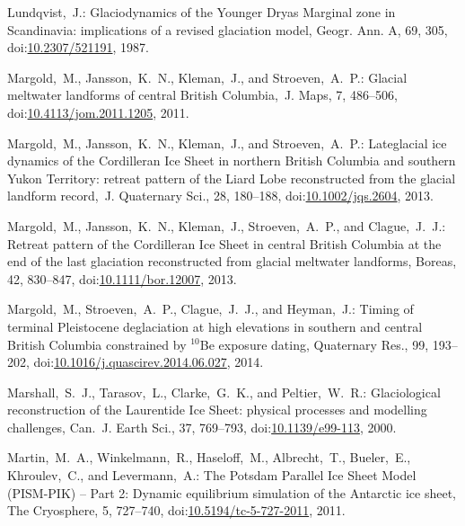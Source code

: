 \documentclass[tc, manuscript]{copernicus}
\begin{document}
\begin{thebibliography}{114}
Lundqvist,~J.: Glaciodynamics of the Younger Dryas Marginal zone in Scandinavia: implications of a revised glaciation model, Geogr. Ann. A, 69, 305,
doi:\href{http://dx.doi.org/10.2307/521191}{10.2307/521191}, 1987.


Margold,~M., Jansson,~K.~N., Kleman,~J., and Stroeven,~A.~P.: Glacial meltwater landforms of central British Columbia,~J. Maps, 7, 486--506,
doi:\href{http://dx.doi.org/10.4113/jom.2011.1205}{10.4113/jom.2011.1205}, 2011.


Margold,~M., Jansson,~K.~N., Kleman,~J., and Stroeven,~A.~P.: Lateglacial ice dynamics of the Cordilleran Ice Sheet in northern British Columbia and southern Yukon Territory: retreat pattern of the Liard Lobe reconstructed from the glacial landform record,~J. Quaternary Sci., 28, 180--188,
doi:\href{http://dx.doi.org/10.1002/jqs.2604}{10.1002/jqs.2604}, 2013{}.


Margold,~M., Jansson,~K.~N., Kleman,~J., Stroeven,~A.~P., and Clague,~J.~J.: Retreat pattern of the Cordilleran Ice Sheet in central British Columbia at the end of the last glaciation reconstructed from glacial meltwater landforms, Boreas, 42, 830--847,
doi:\href{http://dx.doi.org/10.1111/bor.12007}{10.1111/bor.12007}, 2013{}.


Margold,~M., Stroeven,~A.~P., Clague,~J.~J., and Heyman,~J.: Timing of terminal Pleistocene deglaciation at high elevations in southern and central British Columbia constrained by $^{10}$Be exposure dating, Quaternary Res., 99, 193--202,
doi:\href{http://dx.doi.org/10.1016/j.quascirev.2014.06.027}{10.1016/j.quascirev.2014.06.027}, 2014.


Marshall,~S.~J., Tarasov,~L., Clarke,~G.~K., and Peltier,~W.~R.: Glaciological reconstruction of the Laurentide Ice Sheet: physical processes and modelling challenges, Can.~J. Earth Sci., 37, 769--793,
doi:\href{http://dx.doi.org/10.1139/e99-113}{10.1139/e99-113}, 2000.


 Martin,~M.~A., Winkelmann,~R., Haseloff,~M., Albrecht,~T., Bueler,~E., Khroulev,~C., and Levermann,~A.: The Potsdam Parallel Ice Sheet Model (PISM-PIK) -- Part 2: Dynamic equilibrium simulation of the Antarctic ice sheet, The Cryosphere, 5, 727--740,
doi:\href{http://dx.doi.org/10.5194/tc-5-727-2011}{10.5194/tc-5-727-2011}, 2011.




\end{thebibliography}
\end{document}
